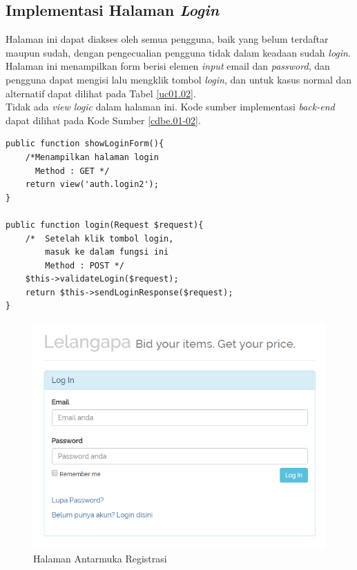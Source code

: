 \subsection{Implementasi Halaman \textit{Login}}
Halaman ini dapat diakses oleh semua pengguna, baik yang belum terdaftar maupun sudah, dengan pengecualian pengguna tidak dalam keadaan sudah \textit{login}. Halaman ini menampilkan form berisi elemen \textit{input} email dan \textit{password}, dan pengguna dapat mengisi lalu mengklik tombol \textit{login}, dan untuk kasus normal dan alternatif dapat dilihat pada Tabel \ref{uc01.02}.\\
\indent Tidak ada \textit{view logic} dalam halaman ini. Kode sumber implementasi \textit{back-end} dapat dilihat pada Kode Sumber \ref{cdbe.01-02}.

\begin{lstlisting}[label=cdbe.01-02,style=php,caption=Kode Sumber Antarmuka Registrasi]
public function showLoginForm(){
	/*Menampilkan halaman login
	  Method : GET */
	return view('auth.login2');
}

public function login(Request $request){
	/*	Setelah klik tombol login,
		masuk ke dalam fungsi ini
		Method : POST */
	$this->validateLogin($request);
	return $this->sendLoginResponse($request);
}

\end{lstlisting}

\begin{figure}[H]
	\centering
	\includegraphics[width=\textwidth]{images/bab4/ui/01-02.png}
	\caption{Halaman Antarmuka Registrasi}
	\label{ui.01-01}
\end{figure}


